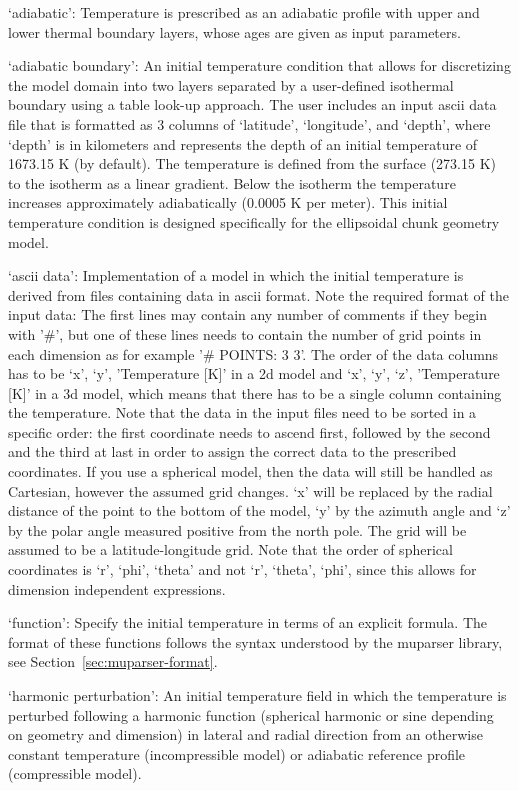 \begin{itemize}
`adiabatic': Temperature is prescribed as an adiabatic profile with upper and lower thermal boundary layers, whose ages are given as input parameters.

`adiabatic boundary': An initial temperature condition that allows for discretizing the model domain into two layers separated by a user-defined isothermal boundary using a table look-up approach. The user includes an input ascii data file that is formatted as 3 columns of `latitude', `longitude', and `depth', where `depth' is in kilometers and represents the depth of an initial temperature of 1673.15 K (by default). The temperature is defined from the surface (273.15 K) to the isotherm as a linear gradient. Below the isotherm the temperature increases approximately adiabatically (0.0005 K per meter). This initial temperature condition is designed specifically for the ellipsoidal chunk geometry model.

`ascii data': Implementation of a model in which the initial temperature is derived from files containing data in ascii format. Note the required format of the input data: The first lines may contain any number of comments if they begin with '\#', but one of these lines needs to contain the number of grid points in each dimension as for example '\# POINTS: 3 3'. The order of the data columns has to be `x', `y', 'Temperature [K]' in a 2d model and  `x', `y', `z', 'Temperature [K]' in a 3d model, which means that there has to be a single column containing the temperature. Note that the data in the input files need to be sorted in a specific order: the first coordinate needs to ascend first, followed by the second and the third at last in order to assign the correct data to the prescribed coordinates. If you use a spherical model, then the data will still be handled as Cartesian, however the assumed grid changes. `x' will be replaced by the radial distance of the point to the bottom of the model, `y' by the azimuth angle and `z' by the polar angle measured positive from the north pole. The grid will be assumed to be a latitude-longitude grid. Note that the order of spherical coordinates is `r', `phi', `theta' and not `r', `theta', `phi', since this allows for dimension independent expressions.

`function': Specify the initial temperature in terms of an explicit formula. The format of these functions follows the syntax understood by the muparser library, see Section~\ref{sec:muparser-format}.

`harmonic perturbation': An initial temperature field in which the temperature is perturbed following a harmonic function (spherical harmonic or sine depending on geometry and dimension) in lateral and radial direction from an otherwise constant temperature (incompressible model) or adiabatic reference profile (compressible model).


\end{itemize}
